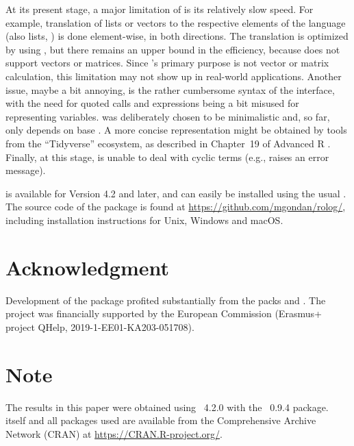 \documentclass[article]{jss}
\begin{document}
At its present stage, a major limitation of  is its relatively slow
speed. For example, translation of  lists or vectors to the
respective elements of the  language (also lists, )
is done element-wise, in both directions. The translation is optimized by
using  \citep{Edelbuettel2018}, but there remains an upper bound in
the efficiency, because  does not support vectors or
matrices. Since 's primary purpose is not vector or matrix
calculation, this limitation may not show up in real-world applications.
Another issue, maybe a bit annoying, is the rather cumbersome syntax of the
interface, with the need for quoted calls and  expressions being a
bit misused for representing  variables.  was
deliberately chosen to be minimalistic and, so far, only depends on 
base . A more concise representation might be obtained by tools from
the ``Tidyverse'' ecosystem, as described in Chapter\ 19 of 
Advanced R \citep{Wickham2019}. Finally, at this stage,  is unable to
deal with cyclic 
terms (e.g., 
raises an error message).

 is available for  Version 4.2 and later, and can easily
be installed using the usual . The source code
of the package is found at \url{https://github.com/mgondan/rolog/}, including
installation instructions for Unix, Windows and macOS.

\section*{Acknowledgment}

Development of the package profited substantially from 
the  packs  \citep{Rserve} 
and  \citep{Angelopoulos2013}. The project was financially supported
by the European Commission (Erasmus+ project QHelp, 2019-1-EE01-KA203-051708).

\section*{Note}

The results in this paper were obtained 
using ~4.2.0 with 
the ~0.9.4 package.  itself
and all packages used are available from the 
Comprehensive  Archive Network (CRAN) 
at \url{https://CRAN.R-project.org/}.


\end{document}
